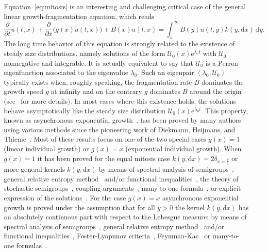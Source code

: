 \documentclass[AHL,Unicode,longabstracts,published]{cedram}
\newcommand{\dis}{\displaystyle}
\newcommand{\p}{\partial}
\newcommand{\ddt}{\frac{\p}{\p t}}
\newcommand{\ddx}{\frac{\p}{\p x}}
\newcommand{\Ucal}{\mathcal{U}}
\newcommand{\1}{\mathds{1}}
\newcommand{\e}{\mathrm{e}}
\renewcommand{\d}{\mathrm{d}}
\begin{document}
Equation~\eqref{eq:mitosis} is an interesting and challenging critical case of the general linear growth-fragmentation equation, which reads
\[
\dis \ddt u(t,x) + \ddx \big(g(x)u(t,x)\big) + B(x)u(t,x) = \int_x^\infty B(y)u(t,y)k(y,\d x)\,\d y.
\]
The long time behavior of this equation is strongly related to the existence of steady size distributions, namely solutions of the form $\Ucal_0(x)\e^{\lambda_0 t}$ with $\Ucal_0$ nonnegative and integrable. It is actually equivalent to say that $\Ucal_0$ is a Perron eigenfunction associated to the eigenvalue $\lambda_0$. Such an eigenpair $(\lambda_0,\Ucal_0)$ typically exists when, roughly speaking, the fragmentation rate $B$ dominates the growth speed $g$ at infinity and on the contrary $g$ dominates $B$ around the origin (see~\cite{DoumicEscobedo,DG,Doumic2018} for more details). In most cases where this existence holds, the solutions behave asymptotically like the steady size distribution $\Ucal_0(x)\e^{\lambda_0 t}.$ This property, known as asynchronous exponential growth~\cite{WebbGrabosch}, has been proved by many authors using various methods since the pioneering work of Diekmann, Heijmans, and Thieme~\cite{Diekmann1984}. Most of these results focus on one of the two special cases $g(x)=1$ (linear individual growth) or $g(x)=x$ (exponential individual growth). When $g(x)=1$ it has been proved for the equal mitosis case $k(y,\d x)=2\delta_{x=\frac y2}$ or more general kernels $k(y,\d x)$ by means of spectral analysis of semigroups~\cite{BernardGabriel2,Diekmann1984,GreinerNagel,Heijmans1984,MischlerScher}, general relative entropy method~\cite{Debiec2018,Michel2005} and/or functional inequalities~\cite{Balague2013,Caceres2011,LaurencotPerthame,Monmarche,Pakdaman2014,PerthameRhyzik}, the theory of stochastic semigroups~\cite{Bansaye2019,Broda,Bouguet,BanasiakPichorRudnicki,CanizoYoldas,CanizoGabrielYoldas,RudnickiPichor}, coupling arguments~\cite{BCGMZ,ChafaiMalrieuParoux,Malrieu}, many-to-one formula~\cite{Cloez}, or explicit expression of the solutions~\cite{Zaidi2015}. For the case $g(x)=x$ asynchronous exponential growth is proved under the assumption that for all $y>0$ the kernel $k(y,\d x)$ has an absolutely continuous part with respect to the Lebesgue measure: by means of spectral analysis of semigroups~\cite{BernardGabriel2,Heijmans1984,MischlerScher}, general relative entropy method~\cite{Escobedo2005,Michel2005} and/or functional inequalities~\cite{Balague2013,Caceres2010,Caceres2011,GabrielSalvarani}, Foster-Lyapunov criteria~\cite{Bouguet,CanizoGabrielYoldas}, Feynman-Kac~\cite{Bertoin2019,BertoinWatson2018,BertoinWatson2019,Cavalli} or many-to-one formulas~\cite{Marguet2}.
\end{document}
